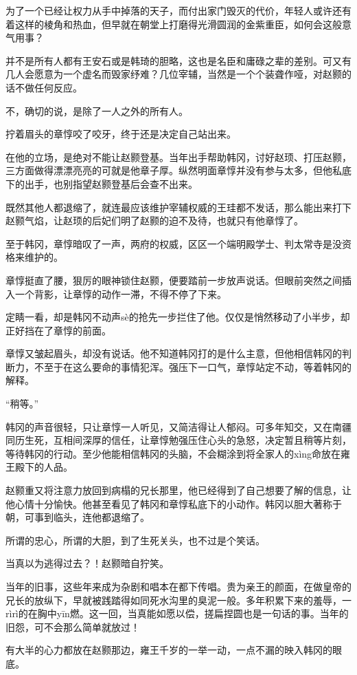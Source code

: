 为了一个已经让权力从手中掉落的天子，而付出家门毁灭的代价，年轻人或许还有着这样的棱角和热血，但早就在朝堂上打磨得光滑圆润的金紫重臣，如何会这般意气用事？

并不是所有人都有王安石或是韩琦的胆略，这也是名臣和庸碌之辈的差别。可又有几人会愿意为一个虚名而毁家纾难？几位宰辅，当然是一个个装聋作哑，对赵颢的话不做任何反应。

不，确切的说，是除了一人之外的所有人。

拧着眉头的章惇咬了咬牙，终于还是决定自己站出来。

在他的立场，是绝对不能让赵颢登基。当年出手帮助韩冈，讨好赵顼、打压赵颢，三方面做得漂漂亮亮的可就是他章子厚。纵然明面章惇并没有参与太多，但他私底下的出手，也别指望赵颢登基后会查不出来。

既然其他人都退缩了，就连最应该维护宰辅权威的王珪都不发话，那么能出来打下赵颢气焰，让赵顼的后妃们明了赵颢的迫不及待，也就只有他章惇了。

至于韩冈，章惇暗叹了一声，两府的权威，区区一个端明殿学士、判太常寺是没资格来维护的。

章惇挺直了腰，狠厉的眼神锁住赵颢，便要踏前一步放声说话。但眼前突然之间插入一个背影，让章惇的动作一滞，不得不停了下来。

定睛一看，却是韩冈不动声sè的抢先一步拦住了他。仅仅是悄然移动了小半步，却正好挡在了章惇的前面。

章惇又皱起眉头，却没有说话。他不知道韩冈打的是什么主意，但他相信韩冈的判断力，不至于在这么要命的事情犯浑。强压下一口气，章惇站定不动，等着韩冈的解释。

“稍等。”

韩冈的声音很轻，只让章惇一人听见，又简洁得让人郁闷。可多年知交，又在南疆同历生死，互相间深厚的信任，让章惇勉强压住心头的急怒，决定暂且稍等片刻，等待韩冈的行动。至少他能相信韩冈的头脑，不会糊涂到将全家人的xìng命放在雍王殿下的人品。

赵颢重又将注意力放回到病榻的兄长那里，他已经得到了自己想要了解的信息，让他心情十分愉快。他甚至看见了韩冈和章惇私底下的小动作。韩冈以胆大著称于朝，可事到临头，连他都退缩了。

所谓的忠心，所谓的大胆，到了生死关头，也不过是个笑话。

当真以为逃得过去？！赵颢暗自狞笑。

当年的旧事，这些年来成为杂剧和唱本在都下传唱。贵为亲王的颜面，在做皇帝的兄长的放纵下，早就被践踏得如同死水沟里的臭泥一般。多年积累下来的羞辱，一rìrì的在胸中yīn燃。这一回，当真能如愿以偿，搓扁捏圆也是一句话的事。当年的旧怨，可不会那么简单就放过！

有大半的心力都放在赵颢那边，雍王千岁的一举一动，一点不漏的映入韩冈的眼底。

